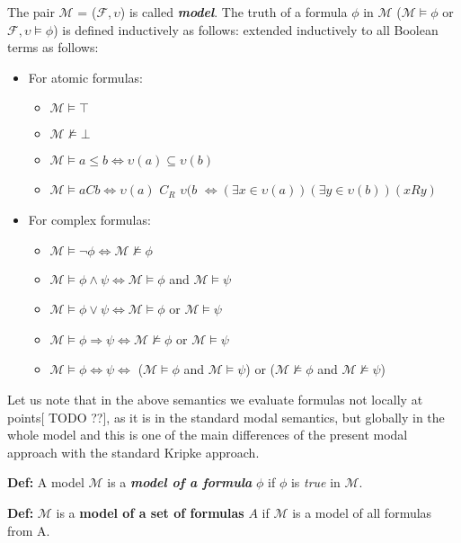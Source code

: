 \documentclass{article}
\newcommand\M{\mathcal{M}}
\newcommand\F{\mathcal{F}}
\newcommand\Def{\noindent \textbf{Def: }}
\begin{document}
	\par
	The pair $\M$ = ($\F, \upsilon$) is called \textbf{\textit{model}}. The truth of a formula $\phi$ in $\M$ ($\M \models \phi$ or $\F, \upsilon \models \phi$) is defined inductively as follows: extended inductively to all Boolean terms as follows:
	\begin{itemize}
		\item For atomic formulas:
			\begin{itemize}
				\item $\M \models \top$
				\item $\M \not\models \bot$
				\item $\M \models a \leq b \iff \upsilon(a) \subseteq \upsilon(b)$
				\item $\M \models aCb \iff \upsilon(a)$ $C_R$ $\upsilon(b$ $\iff (\exists x \in \upsilon(a))(\exists y \in \upsilon(b))(xRy)$
			\end{itemize}
		\item For complex formulas:
			\begin{itemize}
				\item $\M \models \neg \phi \iff \M \not\models \phi$
				\item $\M \models \phi \land \psi \iff \M \models \phi$ and $\M \models \psi$
				\item $\M \models \phi \lor \psi \iff \M \models \phi$ or $\M \models \psi$
				\item $\M \models \phi \Rightarrow \psi \iff \M \not\models \phi$ or $\M \models \psi$
				\item $\M \models \phi \Leftrightarrow \psi \iff$ ($\M \models \phi$ and $\M \models \psi$) or ($\M \not\models \phi$ and $\M \not\models \psi$)
			\end{itemize}
	\end{itemize}

	\par
	Let us note that in the above semantics we evaluate formulas not locally at points[ TODO ??], as it is in the standard modal semantics, but globally in the whole model and this is one of the main differences of the present modal approach with the standard Kripke approach.

	\par
	\Def A model $\M$ is a \textit{\textbf{model of a formula}} $\phi$ if $\phi$ is \textit{true} in $\M$.


	\par
	\Def $\M$ is a \textbf{model of a set of formulas} $A$ if $\M$ is a model of all formulas from A.
\end{document}
